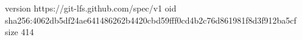 version https://git-lfs.github.com/spec/v1
oid sha256:4062db5df24ae641486262b4420cbd59fff0cd4b2c76d861981f8d3f912ba5cf
size 414

